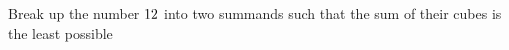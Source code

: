 
%
%
%
%
% 
% 


\question[2] Break up the number $12$ into two summands such that the sum of their cubes
is the least possible


